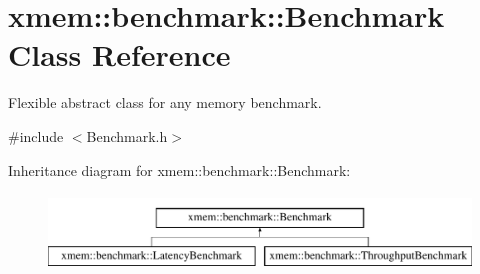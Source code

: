 \hypertarget{classxmem_1_1benchmark_1_1_benchmark}{\section{xmem\-:\-:benchmark\-:\-:Benchmark Class Reference}
\label{classxmem_1_1benchmark_1_1_benchmark}
}


Flexible abstract class for any memory benchmark.  




{\ttfamily \#include $<$Benchmark.\-h$>$}

Inheritance diagram for xmem\-:\-:benchmark\-:\-:Benchmark\-:\begin{figure}[H]
\begin{center}
\leavevmode
\includegraphics[height=2.000000cm]{classxmem_1_1benchmark_1_1_benchmark}
\end{center}
\end{figure}
